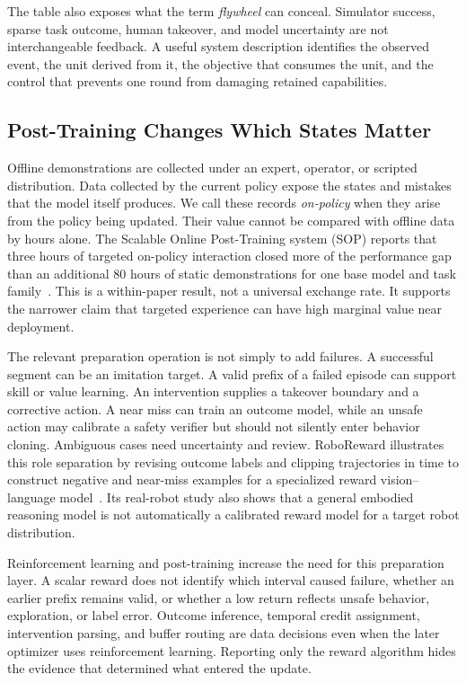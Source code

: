 

The table also exposes what the term \emph{flywheel} can conceal. Simulator success, sparse task outcome, human takeover, and model uncertainty are not interchangeable feedback. A useful system description identifies the observed event, the unit derived from it, the objective that consumes the unit, and the control that prevents one round from damaging retained capabilities.

\subsection{Post-Training Changes Which States Matter}

Offline demonstrations are collected under an expert, operator, or scripted distribution. Data collected by the current policy expose the states and mistakes that the model itself produces. We call these records \emph{on-policy} when they arise from the policy being updated. Their value cannot be compared with offline data by hours alone. The Scalable Online Post-Training system (SOP) reports that three hours of targeted on-policy interaction closed more of the performance gap than an additional 80 hours of static demonstrations for one base model and task family~\cite{pan2026sop_2601_03044}. This is a within-paper result, not a universal exchange rate. It supports the narrower claim that targeted experience can have high marginal value near deployment.

The relevant preparation operation is not simply to add failures. A successful segment can be an imitation target. A valid prefix of a failed episode can support skill or value learning. An intervention supplies a takeover boundary and a corrective action. A near miss can train an outcome model, while an unsafe action may calibrate a safety verifier but should not silently enter behavior cloning. Ambiguous cases need uncertainty and review. RoboReward illustrates this role separation by revising outcome labels and clipping trajectories in time to construct negative and near-miss examples for a specialized reward vision--language model~\cite{lee2026roboreward_2601_00675}. Its real-robot study also shows that a general embodied reasoning model is not automatically a calibrated reward model for a target robot distribution.

Reinforcement learning and post-training increase the need for this preparation layer. A scalar reward does not identify which interval caused failure, whether an earlier prefix remains valid, or whether a low return reflects unsafe behavior, exploration, or label error. Outcome inference, temporal credit assignment, intervention parsing, and buffer routing are data decisions even when the later optimizer uses reinforcement learning. Reporting only the reward algorithm hides the evidence that determined what entered the update.

